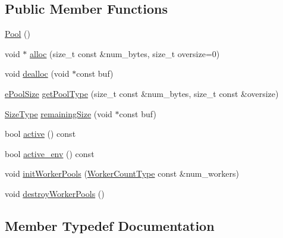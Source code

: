 \subsection*{Public Member Functions}
\begin{DoxyCompactItemize}
\item 
\hyperlink{structvt_1_1pool_1_1_pool_a55a236c42c331940884370c85fb18e36}{Pool} ()
\item 
void $\ast$ \hyperlink{structvt_1_1pool_1_1_pool_a0bf20e8b4ad1b85fb8952d81d433da55}{alloc} (size\+\_\+t const \&num\+\_\+bytes, size\+\_\+t oversize=0)
\item 
void \hyperlink{structvt_1_1pool_1_1_pool_a73ef123aa04b44ae875716e2c7b95cab}{dealloc} (void $\ast$const buf)
\item 
\hyperlink{structvt_1_1pool_1_1_pool_ace8d36439e5e599a8ee68b2f1a6a6b28}{e\+Pool\+Size} \hyperlink{structvt_1_1pool_1_1_pool_a9aa5afbbea5a61265746c4d461502d62}{get\+Pool\+Type} (size\+\_\+t const \&num\+\_\+bytes, size\+\_\+t const \&oversize)
\item 
\hyperlink{structvt_1_1pool_1_1_pool_a4030898e09d0160c24743a7b949c0d46}{Size\+Type} \hyperlink{structvt_1_1pool_1_1_pool_a7d6742d6abc615255e25363a1be067be}{remaining\+Size} (void $\ast$const buf)
\item 
bool \hyperlink{structvt_1_1pool_1_1_pool_a3f34112821d767815d5049dc83503033}{active} () const
\item 
bool \hyperlink{structvt_1_1pool_1_1_pool_aa11bdd76d9f6491ac412d5abc5c63274}{active\+\_\+env} () const
\item 
void \hyperlink{structvt_1_1pool_1_1_pool_aeb8ad6a3ac3cf168dc4f2d2be2714edc}{init\+Worker\+Pools} (\hyperlink{namespacevt_aa93398ea48f2cb6c188512250f7cc248}{Worker\+Count\+Type} const \&num\+\_\+workers)
\item 
void \hyperlink{structvt_1_1pool_1_1_pool_a7667904b82ae8b830a6038e8bbf4939d}{destroy\+Worker\+Pools} ()
\end{DoxyCompactItemize}


\subsection{Member Typedef Documentation}
\mbox{\label{structvt_1_1pool_1_1_pool_acc5ad2d64bf6ff58fead958a69c12d74}} 
